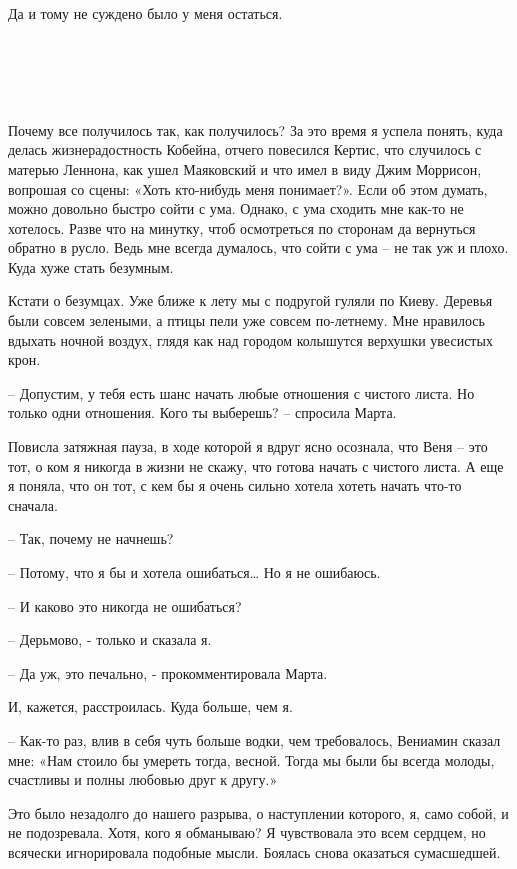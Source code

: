 \documentclass[
]{book}
\begin{document}
Да и тому не суждено было у меня остаться.

\hypertarget{chapter-101}{%
\chapter{~}\label{chapter-101}}

Почему все получилось так, как получилось? За это время я успела понять, куда делась жизнерадостность Кобейна, отчего повесился Кертис, что случилось с матерью Леннона, как ушел Маяковский и что имел в виду Джим Моррисон, вопрошая со сцены: «Хоть кто-нибудь меня понимает?». Если об этом думать, можно довольно быстро сойти с ума. Однако, с ума сходить мне как-то не хотелось. Разве что на минутку, чтоб осмотреться по сторонам да вернуться обратно в русло. Ведь мне всегда думалось, что сойти с ума -- не так уж и плохо. Куда хуже стать безумным.

Кстати о безумцах. Уже ближе к лету мы с подругой гуляли по Киеву. Деревья были совсем зелеными, а птицы пели уже совсем по-летнему. Мне нравилось вдыхать ночной воздух, глядя как над городом колышутся верхушки увесистых крон.

-- Допустим, у тебя есть шанс начать любые отношения с чистого листа. Но только одни отношения. Кого ты выберешь? -- спросила Марта.

Повисла затяжная пауза, в ходе которой я вдруг ясно осознала, что Веня -- это тот, о ком я никогда в жизни не скажу, что готова начать с чистого листа. А еще я поняла, что он тот, с кем бы я очень сильно хотела хотеть начать что-то сначала.

-- Так, почему не начнешь?

-- Потому, что я бы и хотела ошибаться\ldots{} Но я не ошибаюсь.

-- И каково это никогда не ошибаться?

-- Дерьмово, - только и сказала я.

-- Да уж, это печально, - прокомментировала Марта.

И, кажется, расстроилась. Куда больше, чем я.

-- Как-то раз, влив в себя чуть больше водки, чем требовалось, Вениамин сказал мне: «Нам стоило бы умереть тогда, весной. Тогда мы были бы всегда молоды, счастливы и полны любовью друг к другу.»

Это было незадолго до нашего разрыва, о наступлении которого, я, само собой, и не подозревала. Хотя, кого я обманываю? Я чувствовала это всем сердцем, но всячески игнорировала подобные мысли. Боялась снова оказаться сумасшедшей.
\end{document}
